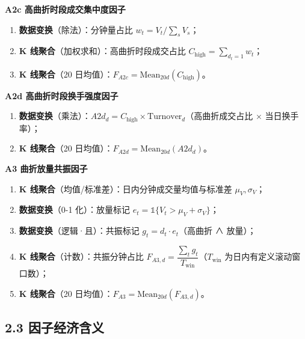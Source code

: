 \documentclass[UTF8,a4paper,zihao=-4,fontset=windows]{ctexart}
\providecommand{\tightlist}{\setlength{\itemsep}{0pt}\setlength{\parskip}{0pt}}
\begin{document}
\textbf{A2c 高曲折时段成交集中度因子}

\begin{enumerate}
\def\labelenumi{\arabic{enumi}.}
\tightlist
\item
  \textbf{数据变换}（除法）：分钟量占比 \(w_t=V_t/\sum_s V_s\)；
\item
  \textbf{K 线聚合}（加权求和）：高曲折时段成交占比
  \(C_{\mathrm{high}}=\sum_{d_t=1}w_t\)；
\item
  \textbf{K 线聚合}（20
  日均值）：\(F_{A2c}=\mathrm{Mean}_{20d}(C_{\mathrm{high}})\)。
\end{enumerate}

\textbf{A2d 高曲折时段换手强度因子}

\begin{enumerate}
\def\labelenumi{\arabic{enumi}.}
\tightlist
\item
  \textbf{数据变换}（乘法）：\(A2d_d=C_{\mathrm{high}}\times\mathrm{Turnover}_d\)（高曲折成交占比
  × 当日换手率）；
\item
  \textbf{K 线聚合}（20
  日均值）：\(F_{A2d}=\mathrm{Mean}_{20d}(A2d_d)\)。
\end{enumerate}

\textbf{A3 曲折放量共振因子}

\begin{enumerate}
\def\labelenumi{\arabic{enumi}.}
\tightlist
\item
  \textbf{K 线聚合}（均值/标准差）：日内分钟成交量均值与标准差
  \(\mu_V,\sigma_V\)；
\item
  \textbf{数据变换}（0-1 化）：放量标记
  \(e_t=\mathbb{1}\{V_t>\mu_V+\sigma_V\}\)；
\item
  \textbf{数据变换}（逻辑·且）：共振标记 \(g_t=d_t\cdot e_t\)（高曲折 ∧
  放量）；
\item
  \textbf{K 线聚合}（计数）：共振分钟占比
  \(F_{A3,d}=\dfrac{\sum_t g_t}{T_{\mathrm{win}}}\)（\(T_{\mathrm{win}}\)
  为日内有定义滚动窗口数）；
\item
  \textbf{K 线聚合}（20
  日均值）：\(F_{A3}=\mathrm{Mean}_{20d}(F_{A3,d})\)。
\end{enumerate}

\subsection{2.3
因子经济含义}\label{ux56e0ux5b50ux7ecfux6d4eux542bux4e49}
\end{document}
